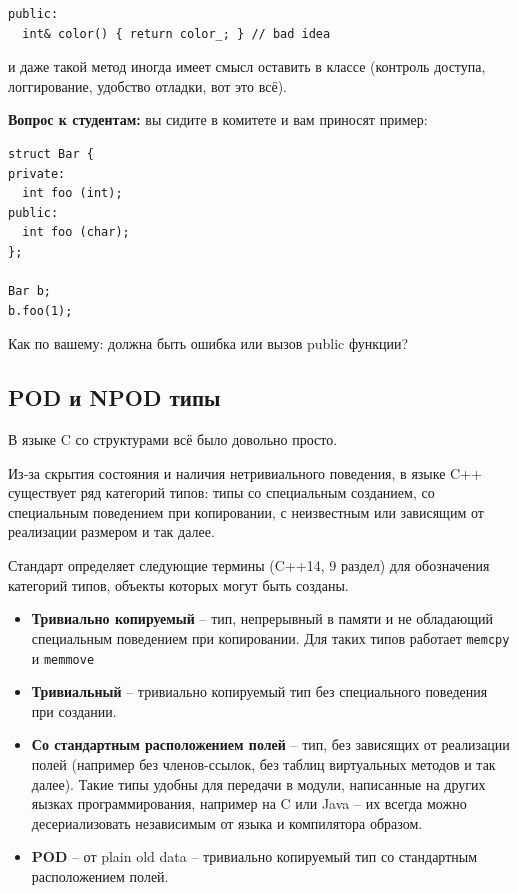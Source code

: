 \documentclass[a4paper,12pt,oneside]{book}
\newif\ifanswers
\begin{document}
\begin{lstlisting}
public:
  int& color() { return color_; } // bad idea
\end{lstlisting}

и даже такой метод иногда имеет смысл оставить в классе (контроль доступа, логгирование, удобство отладки, вот это всё).
\fi

\textbf{Вопрос к студентам:} вы сидите в комитете и вам приносят пример:

\begin{lstlisting}
struct Bar {
private:
  int foo (int);
public:
  int foo (char);
};

Bar b;
b.foo(1);
\end{lstlisting}

Как по вашему: должна быть ошибка или вызов public функции?

\ifanswers
Правильный ответ: де-факто здесь будет ошибка. И это можно обосновать: представьте, вы решили закрыть доступ для некоего метода. Вы конечно хотели бы, чтобы во всех местах, где вы его использовали, была ошибка, но если по месту использования он может просто связаться с другой перегрузкой, её не будет.
\fi

\subsection{POD и NPOD типы}\label{PodNpod}

В языке C со структурами всё было довольно просто.

Из-за скрытия состояния и наличия нетривиального поведения, в языке C++ существует ряд категорий типов: типы со специальным созданием, со специальным поведением при копировании, с неизвестным или зависящим от реализации размером и так далее.

Стандарт определяет следующие термины (C++14, 9 раздел) для обозначения категорий типов, объекты которых могут быть созданы.

\begin{itemize}
\item \textbf{Тривиально копируемый} -- тип, непрерывный в памяти и не обладающий специальным поведением при копировании. Для таких типов работает \lstinline!memcpy! и \lstinline!memmove! 
\item \textbf{Тривиальный} -- тривиально копируемый тип без специального поведения при создании.
\item \textbf{Со стандартным расположением полей} -- тип, без зависящих от реализации полей (например без членов-ссылок, без таблиц виртуальных методов и так далее). Такие типы удобны для передачи в модули, написанные на других яызках программирования, например на C или Java -- их всегда можно десериализовать независимым от языка и компилятора образом.
\item \textbf{POD} -- от plain old data -- тривиально копируемый тип со стандартным расположением полей.
\end{itemize}
\end{document}
